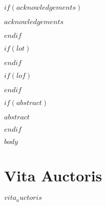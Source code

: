 \documentclass[phdthesis,12pt,final]{wuthesis}
\begin{document}
$if(acknowledgements)$
\cleardoublepage
\begin{thesisacknowledgments}
$acknowledgements$
\end{thesisacknowledgments}
$endif$

\cleardoublepage
\begin{singlespace}
\setcounter{page}{2}
\renewcommand*\contentsname{Table of Contents}
\tableofcontents
\end{singlespace}

$if(lot)$
\cleardoublepage
{}
{}
\begin{center}
\end{center}
\vspace{1em}
\begin{singlespace}
\listoftables
\end{singlespace}
$endif$

$if(lof)$
\cleardoublepage
{}
{}
\begin{center}
\end{center}
\vspace{1em}
\begin{singlespace}
\listoffigures
\end{singlespace}
$endif$

$if(abstract)$
\cleardoublepage
\begin{thesisabstract}
$abstract$
\end{thesisabstract}
$endif$

\cleardoublepage
{}
\setcounter{page}{1}

$body$

\backmatter

\printbibliography[heading=bibintoc,title=References]

\cleardoublepage
{}
{}
\chapter*{Vita Auctoris}
\begin{doublespace}
$vita_auctoris$
\end{doublespace}
\end{document}
